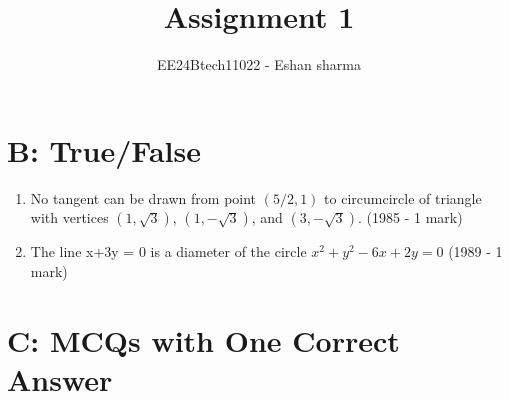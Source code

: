 \documentclass[journal,12pt,twocolumn]{IEEEtran}
\theoremstyle{remark}
\begin{document}

\vspace{3cm}

\title{Assignment 1}
\author{EE24Btech11022 - Eshan sharma}
\maketitle
\newpage
\bigskip

\renewcommand{\thefigure}{\theenumi}
\renewcommand{\thetable}{\theenumi}


\section*{B: True/False}


\begin{enumerate}
    \item No tangent can be drawn from point $(5/2, 1)$ to circumcircle of triangle with vertices $(1, \sqrt{3})$, $(1, -\sqrt{3})$, and $(3, -\sqrt{3})$.
    \hfill{(1985 - 1 mark)}
    \item The line x+3y = 0 is a diameter of the circle $ x^{2} + y^{2} - 6x +2y = 0$
    \hfill{(1989 - 1 mark)}
\end{enumerate}

\section*{C: MCQs with One Correct Answer}
\end{document}
